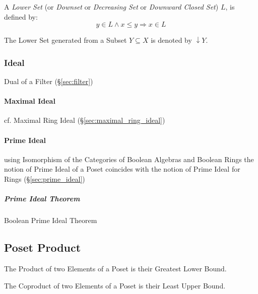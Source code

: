 A \emph{Lower Set} (or \emph{Downset} or \emph{Decreasing Set} or
\emph{Downward Closed Set}) $L$, is defined by:
\[
  y \in L \wedge x \leq y \Rightarrow x \in L
\]

The Lower Set generated from a Subset $Y \subseteq X$ is denoted by
$\downarrow Y$.



\subsubsection{Ideal}\label{sec:order_ideal}

Dual of a Filter (\S\ref{sec:filter})



\paragraph{Maximal Ideal}\label{sec:maximal_ideal}\hfill

cf. Maximal Ring Ideal (\S\ref{sec:maximal_ring_ideal})



\paragraph{Prime Ideal}\label{sec:order_prime_ideal}\hfill

\fist using Isomorphism of the Categories of Boolean Algebras and Boolean Rings
the notion of Prime Ideal of a Poset coincides with the notion of Prime Ideal
for Rings (\S\ref{sec:prime_ideal})



\subparagraph{Prime Ideal Theorem}\label{sec:prime_ideal_theorem}\hfill

Boolean Prime Ideal Theorem



\subsection{Poset Product}\label{sec:poset_product}

The Product of two Elements of a Poset is their Greatest Lower Bound.

The Coproduct of two Elements of a Poset is their Least Upper Bound.



